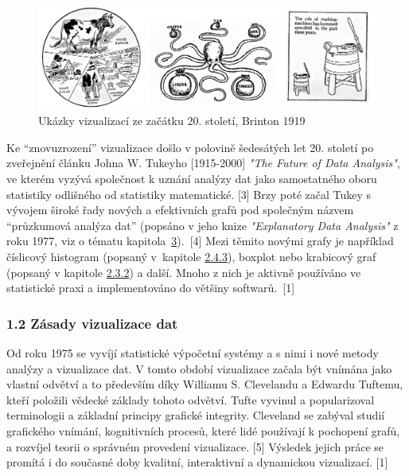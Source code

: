 \documentclass[12pt,]{article}
\begin{document}
\begin{figure}[H]

{\centering \includegraphics[width=1\linewidth]{fig/brinton} 

}

\caption{\label{fig04} Ukázky vizualizací ze začátku 20. století, Brinton 1919}\label{fig:brinton}
\end{figure}

\newpage

\qquad Ke \enquote{znovuzrození} vizualizace došlo v polovině šedesátých
let 20. století po zveřejnění článku Johna W. Tukeyho {[}1915-2000{]}
\textit{"The Future of Data Analysis"}, ve kterém vyzývá společnost k
uznání analýzy dat jako samostatného oboru statistiky odlišného od
statistiky matematické. {[}3{]} Brzy poté začal Tukey s vývojem široké
řady nových a efektivních grafů pod společným názvem \enquote{průzkumová
analýza dat} (popsáno v jeho knize \textit{"Explanatory Data Analysis"}
z roku 1977, viz o tématu kapitola~\protect\hyperlink{EDA}{3}).~{[}4{]}
Mezi těmito novými grafy je například číslicový histogram (popsaný
v~kapitole \protect\hyperlink{stem-and-leaf}{2.4.3}), boxplot nebo
krabicový graf (popsaný v kapitole \protect\hyperlink{boxplot}{2.3.2}) a
další. Mnoho z nich je aktivně používáno ve statistické praxi a
implementováno do většiny softwarů.~{[}1{]}

\subsubsection{1.2 Zásady vizualizace dat}\label{zasady-vizualizace-dat}

\qquad Od roku 1975 se vyvíjí statistické výpočetní systémy a s nimi i
nové metody analýzy a vizualizace dat. V tomto období vizualizace začala
být vnímána jako vlastní odvětví a to především díky Williamu S.
Clevelandu a Edwardu Tuftemu, kteří položili vědecké základy tohoto
odvětví. Tufte vyvinul a popularizoval terminologii a základní principy
grafické integrity. Cleveland se zabýval studií grafického vnímání,
kognitivních procesů, které lidé používají k pochopení grafů, a rozvíjel
teorii o správném provedení vizualizace. {[}5{]} Výsledek jejich práce
se promítá i do současné doby kvalitní, interaktivní a dynamickou
vizualizací. {[}1{]}
\end{document}
